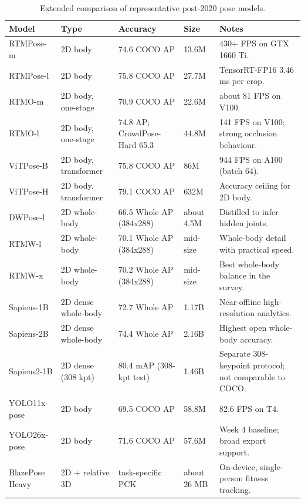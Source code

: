 \documentclass[oneside,openany]{book}
\begin{document}
\begin{appendices}
\begin{table}[!h]
	\begin{center}
		\caption{Extended comparison of representative post-2020 pose models.}
		\label{tab:extended}
		\footnotesize
		\begin{tabular}{p{2.6cm}p{2.4cm}p{2.7cm}p{2.0cm}p{3.0cm}}
			\toprule
			\textbf{Model} & \textbf{Type} & \textbf{Accuracy} & \textbf{Size} & \textbf{Notes} \\
			\midrule
			RTMPose-m \cite{jiang2023rtmpose} & 2D body & 74.6 COCO AP & 13.6M & 430+ FPS on GTX
			1660 Ti. \\
			RTMPose-l \cite{jiang2023rtmpose} & 2D body & 75.8 COCO AP & 27.7M & TensorRT-FP16 3.46
			ms per crop. \\
			RTMO-m \cite{lu2023rtmo} & 2D body, one-stage & 70.9 COCO AP & 22.6M & about 81 FPS on
			V100. \\
			RTMO-l \cite{lu2023rtmo} & 2D body, one-stage & 74.8 AP; CrowdPose-Hard 65.3 & 44.8M &
			141 FPS on V100; strong occlusion behaviour. \\
			ViTPose-B \cite{xu2022vitpose} & 2D body, transformer & 75.8 COCO AP & 86M & 944 FPS on
			A100 (batch 64). \\
			ViTPose-H \cite{xu2022vitpose} & 2D body, transformer & 79.1 COCO AP & 632M & Accuracy
			ceiling for 2D body. \\
			DWPose-l \cite{yang2023dwpose} & 2D whole-body & 66.5 Whole AP (384x288) & about 4.5M &
			Distilled to infer hidden joints. \\
			RTMW-l \cite{jiang2024rtmw} & 2D whole-body & 70.1 Whole AP (384x288) & mid-size &
			Whole-body detail with practical speed. \\
			RTMW-x \cite{jiang2024rtmw} & 2D whole-body & 70.2 Whole AP (384x288) & mid-size & Best
			whole-body balance in the survey. \\
			Sapiens-1B \cite{khirodkar2024sapiens} & 2D dense whole-body & 72.7 Whole AP & 1.17B &
			Near-offline high-resolution analytics. \\
			Sapiens-2B \cite{khirodkar2024sapiens} & 2D dense whole-body & 74.4 Whole AP & 2.16B &
			Highest open whole-body accuracy. \\
			Sapiens2-1B \cite{sapiens2repo} & 2D dense (308 kpt) & 80.4 mAP (308-kpt test) & 1.46B
			& Separate 308-keypoint protocol; not comparable to COCO. \\
			YOLO11x-pose \cite{ultralytics_pose} & 2D body & 69.5 COCO AP & 58.8M & 82.6 FPS on T4. \\
			YOLO26x-pose \cite{ultralytics_pose} & 2D body & 71.6 COCO AP & 57.6M & Week 4 baseline;
			broad export support. \\
			BlazePose Heavy \cite{bazarevsky2020blazepose} & 2D + relative 3D & task-specific PCK &
			about 26 MB & On-device, single-person fitness tracking. \\
			\bottomrule
		\end{tabular}
	\end{center}
\end{table}

\end{appendices}
\end{document}
